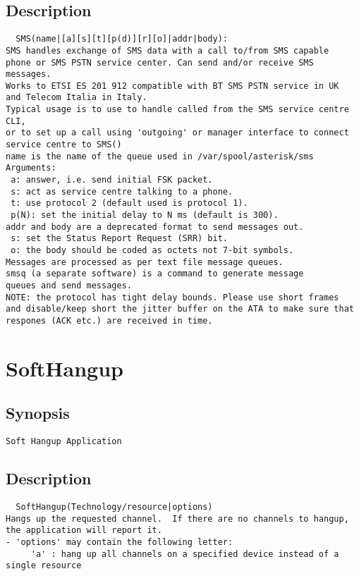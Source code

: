 \subsection{Description}
\begin{verbatim}
  SMS(name|[a][s][t][p(d)][r][o]|addr|body):
SMS handles exchange of SMS data with a call to/from SMS capable
phone or SMS PSTN service center. Can send and/or receive SMS messages.
Works to ETSI ES 201 912 compatible with BT SMS PSTN service in UK
and Telecom Italia in Italy.
Typical usage is to use to handle called from the SMS service centre CLI,
or to set up a call using 'outgoing' or manager interface to connect
service centre to SMS()
name is the name of the queue used in /var/spool/asterisk/sms
Arguments:
 a: answer, i.e. send initial FSK packet.
 s: act as service centre talking to a phone.
 t: use protocol 2 (default used is protocol 1).
 p(N): set the initial delay to N ms (default is 300).
addr and body are a deprecated format to send messages out.
 s: set the Status Report Request (SRR) bit.
 o: the body should be coded as octets not 7-bit symbols.
Messages are processed as per text file message queues.
smsq (a separate software) is a command to generate message
queues and send messages.
NOTE: the protocol has tight delay bounds. Please use short frames
and disable/keep short the jitter buffer on the ATA to make sure that
respones (ACK etc.) are received in time.

\end{verbatim}


\section{SoftHangup}
\subsection{Synopsis}
\begin{verbatim}
Soft Hangup Application
\end{verbatim}
\subsection{Description}
\begin{verbatim}
  SoftHangup(Technology/resource|options)
Hangs up the requested channel.  If there are no channels to hangup,
the application will report it.
- 'options' may contain the following letter:
     'a' : hang up all channels on a specified device instead of a single resource

\end{verbatim}


